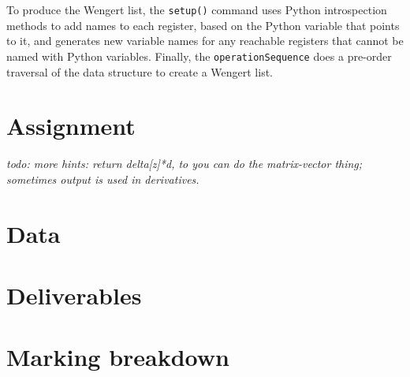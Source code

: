 \documentclass[12pt]{article}
\newcommand{\wc}[1]{\textit{todo: #1}}
\newcommand{\cd}[1]{\texttt{#1}}
\begin{document}
To produce the Wengert list, the \cd{setup()} command uses Python
introspection methods to add names to each register, based on the
Python variable that points to it, and generates new variable names
for any reachable registers that cannot be named with Python
variables.  Finally, the \cd{operationSequence} does a pre-order
traversal of the data structure to create a Wengert list.

\section{Assignment}

\wc{more hints: return delta[z]*d, to you can do the matrix-vector
  thing; sometimes output is used in derivatives.}

\section{Data}

\section{Deliverables}

\section{Marking breakdown}
\end{document}
